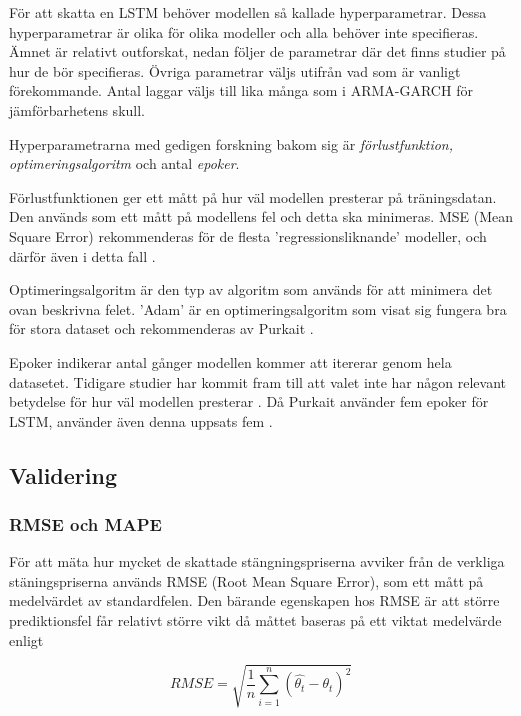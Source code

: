 \documentclass[11pt]{article}
\numberwithin{equation}{section}
\numberwithin{table}{section}
\numberwithin{figure}{section}
\begin{document}
För att skatta en LSTM behöver modellen så kallade hyperparametrar. Dessa hyperparametrar är olika för olika modeller och alla behöver inte specifieras. Ämnet är relativt outforskat, nedan följer de parametrar där det finns studier på hur de bör specifieras. Övriga parametrar väljs utifrån vad som är vanligt förekommande. Antal laggar väljs till lika många som i ARMA-GARCH för jämförbarhetens skull.

Hyperparametrarna med gedigen forskning bakom sig är \textit{förlustfunktion, optimeringsalgoritm} och antal \textit{epoker}.

Förlustfunktionen ger ett mått på hur väl modellen presterar på träningsdatan. Den används som ett mått på modellens fel och detta ska minimeras. MSE (Mean Square Error) rekommenderas för de flesta 'regressionsliknande' modeller, och därför även i detta fall \parencite[][,s.178 ff.]{purkait2019hands}. \par
Optimeringsalgoritm är den typ av algoritm som används för att minimera det ovan beskrivna felet. 'Adam' är en optimeringsalgoritm som visat sig fungera bra för stora dataset och rekommenderas av Purkait \parencite*[][,s.178 ff.]{purkait2019hands}. \par
Epoker indikerar antal gånger modellen kommer att itererar genom hela datasetet. Tidigare studier har kommit fram till att valet inte har någon relevant betydelse för hur väl modellen presterar \parencite{siaminamini2018forecasting}. Då Purkait använder fem epoker för LSTM, använder även denna uppsats fem \parencite[][,s.178 ff.]{purkait2019hands}. \par


\subsection{Validering}
\subsubsection{RMSE och MAPE}
För att mäta hur mycket de skattade stängningspriserna avviker från de verkliga stäningspriserna används RMSE (Root Mean Square Error), som ett mått på medelvärdet av standardfelen. Den bärande egenskapen hos RMSE är att större prediktionsfel får relativt större vikt då måttet baseras på ett viktat medelvärde enligt

\begin{equation}
RMSE = \sqrt{\frac{1}{n}\sum_{i=1}^{n}   (\hat{\theta_{t}} - \theta_{t})^2}
\end{equation}
\end{document}
